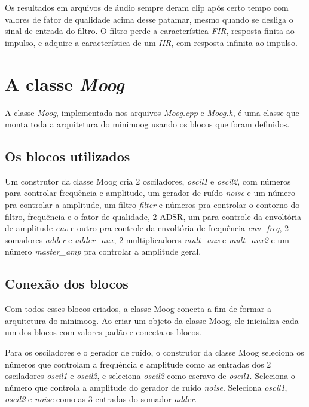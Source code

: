 \documentclass{article}
\begin{document}
Os resultados em arquivos de
áudio sempre deram clip após certo tempo com valores de fator de qualidade acima desse patamar, mesmo quando se desliga o sinal de entrada do filtro.
 O filtro perde a característica \emph{FIR}, resposta finita ao impulso, e adquire a característica de um \emph{IIR}, com resposta infinita ao impulso.



\section{A classe \emph{Moog}}
A classe \emph{Moog}, implementada nos arquivos \emph{Moog.cpp} e \emph{Moog.h}, é uma classe que monta toda a arquitetura do minimoog usando os blocos que foram definidos.

\subsection{Os blocos utilizados}
Um construtor da classe Moog cria 2 osciladores, \emph{oscil1} e \emph{oscil2}, com números para controlar frequência e amplitude, um gerador de ruído \emph{noise} 
e um número pra controlar a amplitude, um filtro \emph{filter} e números pra controlar o contorno do filtro, frequência e o fator de qualidade, 2 ADSR, um para controle da 
envoltória de amplitude \emph{env} e outro pra controle da envoltória de frequência \emph{env\_freq}, 2 somadores \emph{adder} e \emph{adder\_aux}, 2 multiplicadores
\emph{mult\_aux} e \emph{mult\_aux2} e um número \emph{master\_amp} pra controlar a amplitude geral.

\subsection{Conexão dos blocos}
Com todos esses blocos criados, a classe Moog conecta a fim de formar a arquitetura do minimoog. Ao criar um objeto da classe Moog, ele inicializa 
cada um dos blocos com valores padão e conecta os blocos.



Para os osciladores e o gerador de ruído, o construtor da classe Moog seleciona os números que controlam a frequência e amplitude como as entradas dos
2 osciladores \emph{oscil1} e \emph{oscil2}, e seleciona \emph{oscil2} como escravo de \emph{oscil1}. Seleciona o número que controla a amplitude do gerador de 
ruído \emph{noise}. Seleciona \emph{oscil1}, \emph{oscil2} e \emph{noise} como as 3 entradas do somador \emph{adder}. 
\end{document}
